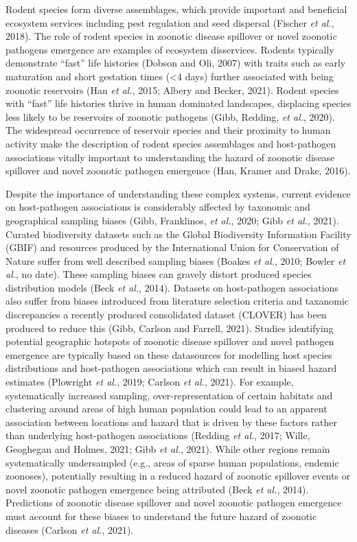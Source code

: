 \documentclass[
]{article}
\begin{document}
Rodent species form diverse assemblages, which provide important and
beneficial ecosystem services including pest regulation and seed
dispersal (Fischer \emph{et al.}, 2018). The role of rodent species in
zoonotic disease spillover or novel zoonotic pathogens emergence are
examples of ecosystem disservices. Rodents typically demonstrate
``fast'' life histories (Dobson and Oli, 2007) with traits such as early
maturation and short gestation times (\textless4 days) further
associated with being zoonotic reservoirs (Han \emph{et al.}, 2015;
Albery and Becker, 2021). Rodent species with ``fast'' life histories
thrive in human dominated landscapes, displacing species less likely to
be reservoirs of zoonotic pathogens (Gibb, Redding, \emph{et al.},
2020). The widespread occurrence of reservoir species and their
proximity to human activity make the description of rodent species
assemblages and host-pathogen associations vitally important to
understanding the hazard of zoonotic disease spillover and novel
zoonotic pathogen emergence (Han, Kramer and Drake, 2016).

Despite the importance of understanding these complex systems, current
evidence on host-pathogen associations is considerably affected by
taxonomic and geographical sampling biases (Gibb, Franklinos, \emph{et
al.}, 2020; Gibb \emph{et al.}, 2021). Curated biodiversity datasets
such as the Global Biodiversity Information Facility (GBIF) and
resources produced by the International Union for Conservation of Nature
suffer from well described sampling biases (Boakes \emph{et al.}, 2010;
Bowler \emph{et al.}, no date). These sampling biases can gravely
distort produced species distribution models (Beck \emph{et al.}, 2014).
Datasets on host-pathogen associations also suffer from biases
introduced from literature selection criteria and taxanomic
discrepancies a recently produced consolidated dataset (CLOVER) has been
produced to reduce this (Gibb, Carlson and Farrell, 2021). Studies
identifying potential geographic hotspots of zoonotic disease spillover
and novel pathogen emergence are typically based on these datasources
for modelling host species distributions and host-pathogen associations
which can result in biased hazard estimates (Plowright \emph{et al.},
2019; Carlson \emph{et al.}, 2021). For example, systematically
increased sampling, over-representation of certain habitats and
clustering around areas of high human population could lead to an
apparent association between locations and hazard that is driven by
these factors rather than underlying host-pathogen associations (Redding
\emph{et al.}, 2017; Wille, Geoghegan and Holmes, 2021; Gibb \emph{et
al.}, 2021). While other regions remain systematically undersampled
(e.g., areas of sparse human populations, endemic zoonoses), potentially
resulting in a reduced hazard of zoonotic spillover events or novel
zoonotic pathogen emergence being attributed (Beck \emph{et al.}, 2014).
Predictions of zoonotic disease spillover and novel zoonotic pathogen
emergence must account for these biases to understand the future hazard
of zoonotic diseases (Carlson \emph{et al.}, 2021).
\end{document}
